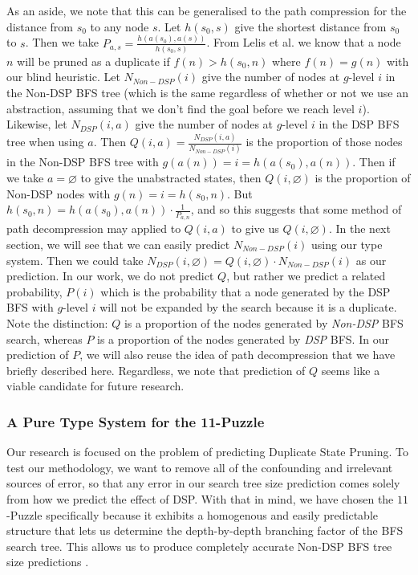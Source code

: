 \documentclass{article}
\begin{document}
   As an aside, we note that this can be generalised to
   the path compression for the distance from \(s_0\) to any node \(s\).
   Let \(h(s_0, s)\) give the shortest distance from \(s_0\) to \(s\).
   Then we take \(P_{a,s} = \frac{h(a(s_0), a(s))}{h(s_0, s)}\).
   From Lelis et al. \cite{lelis2014estimating} we know that a node \(n\) will be pruned as a duplicate if
   \(f(n) > h(s_0, n)\) where \(f(n) = g(n)\) with our blind heuristic.
   Let \(N_{Non-DSP}(i)\) give the number of nodes at \(g\)-level \(i\) in the Non-DSP BFS tree (which is the same regardless of whether
   or not we use an abstraction, assuming that we don't find the goal before we reach level \(i\)).
   Likewise, let \(N_{DSP}(i,a)\) give the number of nodes at \(g\)-level \(i\) in the DSP BFS tree when using \(a\).
   Then \(Q(i, a) = \frac{N_{DSP}(i,a)}{N_{Non-DSP}(i)}\)
   is the proportion of those nodes in the Non-DSP BFS tree with \(g(a(n)) = i = h(a(s_0), a(n))\).
   Then if we take \(a = \varnothing\) to give the unabstracted states, then
   \(Q(i, \varnothing)\) is the proportion of Non-DSP nodes with \(g(n) = i = h(s_0, n)\).
   But \(h(s_0, n) = h(a(s_0), a(n)) \cdot \frac{1}{P_{a,n}}\),
   and so this suggests that some method of path decompression may applied to \(Q(i, a)\)
   to give us \(Q(i, \varnothing)\). In the next section, we will see that we can easily predict \(N_{Non-DSP}(i)\)
   using our type system. Then we could take \(N_{DSP}(i, \varnothing) = Q(i, \varnothing) \cdot N_{Non-DSP}(i)\)
   as our prediction. In our work, we do not predict \(Q\), but rather we predict a related probability,
   \(P(i)\) which is the probability that a node generated by the DSP BFS
   with \(g\)-level \(i\) will not be expanded by the search because it is a duplicate.
   Note the distinction: \(Q\) is a proportion of the nodes generated by \textit{Non-DSP} BFS search,
   whereas \(P\) is a proportion of the nodes generated by \textit{DSP} BFS.
   In our prediction of \(P\), we will also reuse the idea of path decompression that we have briefly described here.
   Regardless, we note that prediction of \(Q\) seems like a viable candidate for future research.
   
\subsubsection*{A Pure Type System for the 11-Puzzle}

Our research is focused on the problem of predicting Duplicate State Pruning.
To test our methodology, we want to remove all of the confounding and irrelevant sources of error,
so that any error in our search tree size prediction comes solely from how we predict the effect of DSP.
With that in mind, we have chosen the \(11\)-Puzzle specifically because it
exhibits a homogenous and easily predictable structure that lets us determine
the depth-by-depth branching factor of the BFS search tree.
This allows us to produce
completely accurate Non-DSP BFS tree size predictions
\citep{edelkamp1998branching}. \\
\end{document}
